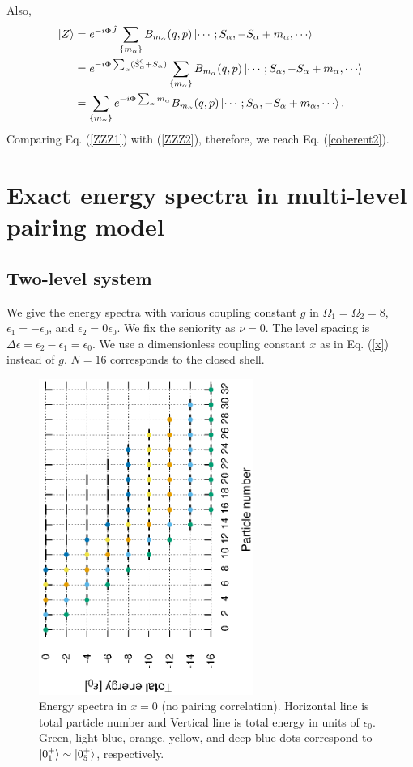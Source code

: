 \documentclass[11pt]{book} %
\begin{document}
Also, 
\begin{align}
 \ket{Z} &= e^{-i\Phi \hat{J}} \sum_{\{m_{\alpha}\}} B_{m_{\alpha}}(q,p) \ket{\cdots;S_{\alpha},-S_{\alpha}+m_{\alpha},\cdots} \nonumber \\
 &= e^{-i\Phi \sum_{\alpha} (\hat{S}_{\alpha}^0 + S_{\alpha})} \sum_{\{m_{\alpha}\}} B_{m_{\alpha}}(q,p) \ket{\cdots;S_{\alpha},-S_{\alpha}+m_{\alpha},\cdots} \nonumber \\
  &= \sum_{\{m_{\alpha}\}} e^{-i\Phi \sum_\alpha m_{\alpha}} B_{m_{\alpha}}(q,p) \ket{\cdots;S_{\alpha},-S_{\alpha}+m_{\alpha},\cdots}.
\label{ZZZ2}
\end{align}
Comparing Eq. (\ref{ZZZ1}) with (\ref{ZZZ2}), therefore, we reach Eq. (\ref{coherent2}).


\clearpage{\pagestyle{empty}\cleardoublepage}
\chapter{Exact energy spectra in multi-level pairing model}
\section{Two-level system}
We give the energy spectra with various coupling constant $g$ in $\Omega_1=\Omega_2=8$, $\epsilon_1=-\epsilon_0$, and $\epsilon_2=0\epsilon_0$. We fix the seniority as $\nu=0$. The level spacing is $\Delta\epsilon = \epsilon_2-\epsilon_1 = \epsilon_0$. We use a dimensionless coupling constant $x$ as in Eq. (\ref{x}) instead of $g$. $N=16$ corresponds to the closed shell.

\begin{figure}[htbp]
 \begin{center}
  \includegraphics[width=70mm,angle=-90]{images/spectra_x0.eps}
 \end{center}
 \caption{Energy spectra in $x=0$ (no pairing correlation). Horizontal line is total particle number and Vertical line is total energy in units of $\epsilon_0$. Green, light blue, orange, yellow, and deep blue dots correspond to $\ket{0_1^+}\sim\ket{0_5^+}$, respectively.
	}
 \label{x0}
\end{figure}
\end{document}
